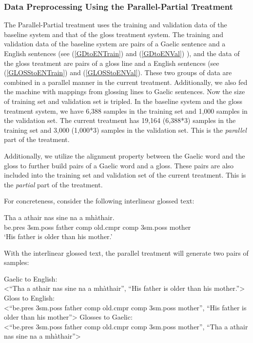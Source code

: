 \documentclass[11pt,a4paper]{article}
\begin{document}
\subsubsection{Data Preprocessing Using the Parallel-Partial Treatment}
The Parallel-Partial treatment uses the training and validation data of the baseline system and that of the gloss treatment system.  
The training and validation data of the baseline system are pairs of a Gaelic sentence and a English sentences (see (\ref{GDtoENTrain}) and (\ref{GDtoENVal}) ), 
and the data of the gloss treatment are pairs of a gloss line and a English sentences (see (\ref{GLOSStoENTrain}) and (\ref{GLOSStoENVal}). 
These two groups of data are combined in a parallel manner in the current treatment. Additionally, we also fed the machine with mappings from glossing lines to Gaelic sentences. Now the size of training set and validation set is tripled. In the baseline system and the gloss treatment system, we have 6,388 samples in the training set and 1,000 samples in the validation set. The current treatment has 19,164 (6,388*3) samples in the training set and 3,000 (1,000*3) samples in the validation set. This is the \textit{parallel} part of the treatment. 

Additionally, we utilize the alignment property between the Gaelic word and the gloss to further build pairs of a Gaelic word and a gloss. These pairs are also included into the training set and validation set of the current treatment. This is the \textit{partial} part of the treatment. 

For concreteness, consider the following interlinear glossed text: 
\begin{exe}  
\ex \gll    Tha a athair nas sine na a mh\`athair.\\  
            be.pres 3sm.poss father comp old.cmpr comp 3sm.poss mother\\  
    \glt    `His father is older than his mother.'  
\end{exe}

With the interlinear glossed text, the parallel treatment will generate two pairs of samples:

\begin{exe}
	\ex \label{21}
	\begin{xlist}
		\ex Gaelic to English: \\<``Tha a athair nas sine na a mh\`athair'', ``His father is older than his mother.''>
		\ex Gloss to English: \\<``be.pres 3sm.poss father comp old.cmpr comp 3sm.poss mother'', ``His father is older than his mother''>
		\ex Glosses to Gaelic: \\<``be.pres 3sm.poss father comp old.cmpr comp 3sm.poss mother'', ``Tha a athair nas sine na a mh\`athair''>
	\end{xlist}
\end{exe}
\end{document}
